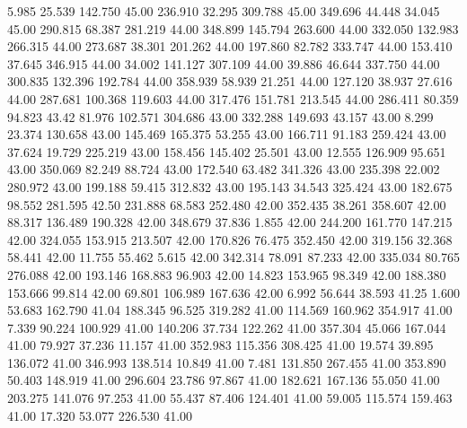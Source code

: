    5.985   25.539  142.750        45.00
 236.910   32.295  309.788        45.00
 349.696   44.448   34.045        45.00
 290.815   68.387  281.219        44.00
 348.899  145.794  263.600        44.00
 332.050  132.983  266.315        44.00
 273.687   38.301  201.262        44.00
 197.860   82.782  333.747        44.00
 153.410   37.645  346.915        44.00
  34.002  141.127  307.109        44.00
  39.886   46.644  337.750        44.00
 300.835  132.396  192.784        44.00
 358.939   58.939   21.251        44.00
 127.120   38.937   27.616        44.00
 287.681  100.368  119.603        44.00
 317.476  151.781  213.545        44.00
 286.411   80.359   94.823        43.42
  81.976  102.571  304.686        43.00
 332.288  149.693   43.157        43.00
   8.299   23.374  130.658        43.00
 145.469  165.375   53.255        43.00
 166.711   91.183  259.424        43.00
  37.624   19.729  225.219        43.00
 158.456  145.402   25.501        43.00
  12.555  126.909   95.651        43.00
 350.069   82.249   88.724        43.00
 172.540   63.482  341.326        43.00
 235.398   22.002  280.972        43.00
 199.188   59.415  312.832        43.00
 195.143   34.543  325.424        43.00
 182.675   98.552  281.595        42.50
 231.888   68.583  252.480        42.00
 352.435   38.261  358.607        42.00
  88.317  136.489  190.328        42.00
 348.679   37.836    1.855        42.00
 244.200  161.770  147.215        42.00
 324.055  153.915  213.507        42.00
 170.826   76.475  352.450        42.00
 319.156   32.368   58.441        42.00
  11.755   55.462    5.615        42.00
 342.314   78.091   87.233        42.00
 335.034   80.765  276.088        42.00
 193.146  168.883   96.903        42.00
  14.823  153.965   98.349        42.00
 188.380  153.666   99.814        42.00
  69.801  106.989  167.636        42.00
   6.992   56.644   38.593        41.25
   1.600   53.683  162.790        41.04
 188.345   96.525  319.282        41.00
 114.569  160.962  354.917        41.00
   7.339   90.224  100.929        41.00
 140.206   37.734  122.262        41.00
 357.304   45.066  167.044        41.00
  79.927   37.236   11.157        41.00
 352.983  115.356  308.425        41.00
  19.574   39.895  136.072        41.00
 346.993  138.514   10.849        41.00
   7.481  131.850  267.455        41.00
 353.890   50.403  148.919        41.00
 296.604   23.786   97.867        41.00
 182.621  167.136   55.050        41.00
 203.275  141.076   97.253        41.00
  55.437   87.406  124.401        41.00
  59.005  115.574  159.463        41.00
  17.320   53.077  226.530        41.00
